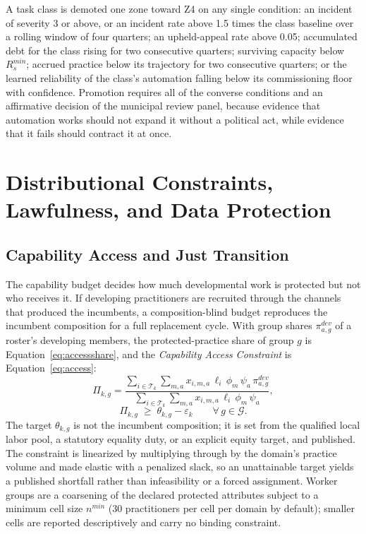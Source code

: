 \documentclass[utf8]{frontiers_suppmat}
\begin{document}
A task class is demoted one zone toward Z4 on any single condition: an incident of severity 3 or above, or an incident rate above 1.5 times the class baseline over a rolling window of four quarters; an upheld-appeal rate above 0.05; accumulated debt for the class rising for two consecutive quarters; surviving capacity below $R^{min}_s$; accrued practice below its trajectory for two consecutive quarters; or the learned reliability of the class's automation falling below its commissioning floor with confidence. Promotion requires all of the converse conditions and an affirmative decision of the municipal review panel, because evidence that automation works should not expand it without a political act, while evidence that it fails should contract it at once.

\section{Distributional Constraints, Lawfulness, and Data Protection}
\label{app:access}

\subsection{Capability Access and Just Transition}
\label{app:access-constraints}

The capability budget decides how much developmental work is protected but not who receives it. If developing practitioners are recruited through the channels that produced the incumbents, a composition-blind budget reproduces the incumbent composition for a full replacement cycle. With group shares $\pi^{dev}_{a,g}$ of a roster's developing members, the protected-practice share of group $g$ is Equation~\eqref{eq:accessshare}, and the \textit{Capability Access Constraint} is Equation~\eqref{eq:access}:
\begin{equation}
	\Pi_{k,g} =
	\frac{\sum_{i \in \mathcal{T}_k} \sum_{m,a} x_{i,m,a}\,\ell_i\,\phi_m\,\psi_a\,\pi^{dev}_{a,g}}
	{\sum_{i \in \mathcal{T}_k} \sum_{m,a} x_{i,m,a}\,\ell_i\,\phi_m\,\psi_a},
	\label{eq:accessshare}
\end{equation}
\begin{equation}
	\Pi_{k,g} \;\geq\; \theta_{k,g} - \varepsilon_k \qquad \forall\, g \in \mathcal{G}.
	\label{eq:access}
\end{equation}
The target $\theta_{k,g}$ is not the incumbent composition; it is set from the qualified local labor pool, a statutory equality duty, or an explicit equity target, and published. The constraint is linearized by multiplying through by the domain's practice volume and made elastic with a penalized slack, so an unattainable target yields a published shortfall rather than infeasibility or a forced assignment. Worker groups are a coarsening of the declared protected attributes subject to a minimum cell size $n^{min}$ (30 practitioners per cell per domain by default); smaller cells are reported descriptively and carry no binding constraint.
\end{document}
